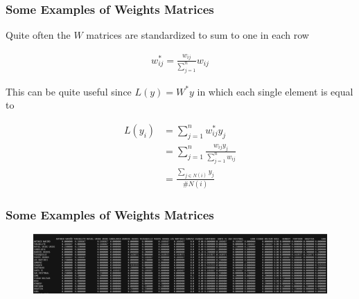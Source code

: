 \documentclass[
  shownotes,
  xcolor={svgnames},
  hyperref={colorlinks,citecolor=DarkBlue,linkcolor=DarkRed,urlcolor=DarkBlue}
   , aspectratio=169]{beamer}
\begin{document}
\begin{frame}[fragile]
\frametitle{Some Examples of Weights Matrices}
Quite often the $W$ matrices are standardized to sum to one in each row

\begin{align}
w^*_{ij}=\frac{w_{ij}}{\sum_{j=1}^n}w_{ij}
\end{align}

This can be quite useful since $L(y) =W^{*} y$ in which each single element is equal to

\begin{align}
L(y_i) &= \sum_{j=1}^n w^*_{ij}y_j \\ \nonumber
&= \sum_{j=1}^n \frac{w_{ij}y_j}{\sum_{j=1}^n w_{ij}}  \\
&= \frac{\sum_{j\in N(i)}y_j}{\# N(i)}
\end{align}
\end{frame}
\begin{frame}[fragile]
\frametitle{Some Examples of Weights Matrices}

  \begin{figure}[H] \centering
    \captionsetup{justification=centering}
    \includegraphics[scale=0.45]{figures/matrix_loc_row_stand}
   \end{figure}

\end{frame}
\end{document}
